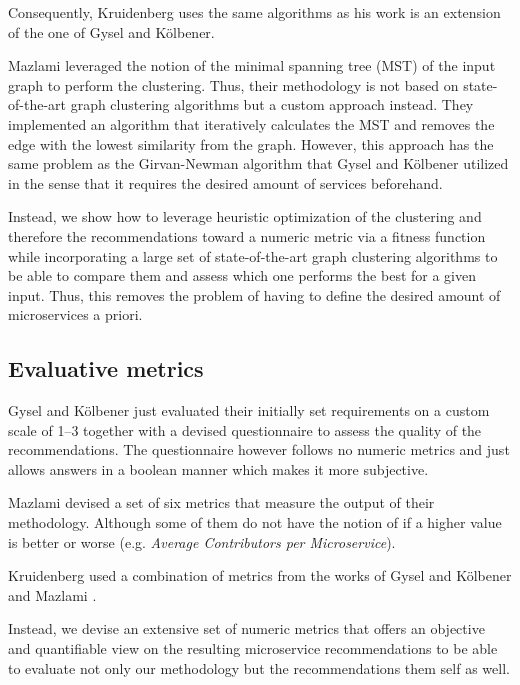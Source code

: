 \documentclass[12pt,a4paper]{report}
\begin{document}
Consequently, Kruidenberg \cite{kruidenberg2018monoliths} uses the same algorithms
as his work is an extension of the one of Gysel and K{\"o}lbener.

Mazlami \cite{mazlami2017extraction} leveraged the notion of the
minimal spanning tree (MST) of the input graph to perform the clustering.
Thus, their methodology is not based on state-of-the-art graph clustering algorithms
but a custom approach instead. They implemented an algorithm
that iteratively calculates the MST and removes the edge with the lowest similarity
from the graph. However, this approach has the same problem as the
Girvan-Newman algorithm \cn that Gysel and K{\"o}lbener utilized in the sense
that it requires the desired amount of services beforehand.

Instead, we show how to leverage heuristic optimization of the clustering and
therefore the recommendations toward a numeric metric via a fitness function
while incorporating a large set of state-of-the-art graph clustering algorithms
to be able to compare them and assess which one performs the best for a given input.
Thus, this removes the problem of having to define the desired amount of microservices
a priori.


\subsection{Evaluative metrics}

Gysel and K{\"o}lbener \cite{gysel2016service} just evaluated their
initially set requirements on a custom scale of 1--3 together with a devised
questionnaire to assess the quality of the recommendations.
The questionnaire however follows no numeric metrics and just allows answers
in a boolean manner which makes it more subjective.

Mazlami \cite{mazlami2017extraction} devised a set of six metrics that measure
the output of their methodology. Although some of them do not have the notion
of if a higher value is better or worse (e.g. \textit{Average Contributors per Microservice}).

Kruidenberg \cite{kruidenberg2018monoliths} used a combination of metrics from
the works of Gysel and K{\"o}lbener \cite{gysel2016service} and
Mazlami \cite{mazlami2017extraction}.

Instead, we devise an extensive set of numeric metrics that offers
an objective and quantifiable view on the resulting microservice recommendations
to be able to evaluate not only our methodology but the recommendations them self as well.
\end{document}
